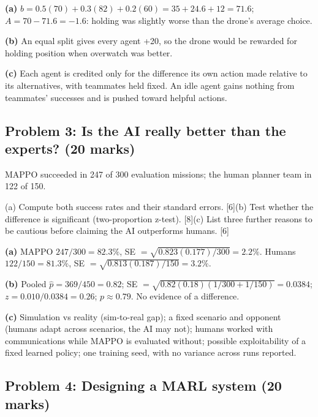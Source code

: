 \documentclass[11pt]{article}
\begin{document}
\begin{soln}\textbf{(a)} $b=0.5(70)+0.3(82)+0.2(60)=35+24.6+12=71.6$; $A=70-71.6=\mathbf{-1.6}$: holding was slightly worse than the drone's average choice.

\textbf{(b)} An equal split gives every agent +20, so the drone would be rewarded for holding position when overwatch was better.

\textbf{(c)} Each agent is credited only for the difference its own action made relative to its alternatives, with teammates held fixed. An idle agent gains nothing from teammates' successes and is pushed toward helpful actions.\end{soln}

\subsection{Problem 3: Is the AI really better than the experts? \normalfont\small\color{GreyN}(20 marks)}

\begin{prob}MAPPO succeeded in 247 of 300 evaluation missions; the human planner team in 122 of 150.

(a) Compute both success rates and their standard errors. [6]\newline (b) Test whether the difference is significant (two-proportion z-test). [8]\newline (c) List three further reasons to be cautious before claiming the AI outperforms humans. [6]\end{prob}

\begin{soln}\textbf{(a)} MAPPO $247/300=82.3\%$, SE $=\sqrt{0.823(0.177)/300}=2.2\%$. Humans $122/150=81.3\%$, SE $=\sqrt{0.813(0.187)/150}=3.2\%$.

\textbf{(b)} Pooled $\hat p=369/450=0.82$; SE $=\sqrt{0.82(0.18)(1/300+1/150)}=0.0384$; $z=0.010/0.0384=0.26$; $p\approx0.79$. No evidence of a difference.

\textbf{(c)} Simulation vs reality (sim-to-real gap); a fixed scenario and opponent (humans adapt across scenarios, the AI may not); humans worked with communications while MAPPO is evaluated without; possible exploitability of a fixed learned policy; one training seed, with no variance across runs reported.\end{soln}

\subsection{Problem 4: Designing a MARL system \normalfont\small\color{GreyN}(20 marks)}
\end{document}
